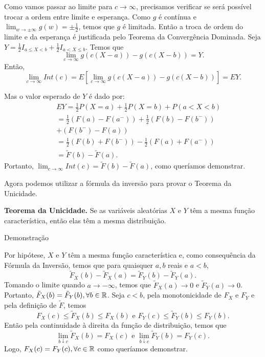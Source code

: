 \begin{frame}
\begin{block}{}

Como vamos passar ao limite para $c\rightarrow\infty$, precisamos verificar se será possível trocar a ordem entre limite e esperança. Como $g$ é contínua e $\lim_{w\rightarrow\pm\infty}g(w)=\pm\frac{1}{2}$, temos que $g$ é limitada. Então a troca de ordem do limite e da esperança é justificada pelo Teorema da Convergência Dominada. Seja $Y=\frac{1}{2}I_{a\leq X<b}+\frac{1}{2}I_{a< X\leq b}$. Temos que
$$\lim_{c\rightarrow\infty}g(c(X-a))-g(c(X-b))=Y.$$
Então,
$$\lim_{c\rightarrow\infty}Int(c)=E[\lim_{c\rightarrow\infty}g(c(X-a))-g(c(X-b))]=EY.$$

Mas o valor esperado de $Y$ é dado por:
\begin{eqnarray}
& & EY=\frac{1}{2}P(X=a)+\frac{1}{2}P(X=b)+P(a<X<b) \nonumber \\
& & =\frac{1}{2}(F(a)-F(a^-))+\frac{1}{2}(F(b)-F(b^-))\nonumber\\
& & +(F(b^-)-F(a)) \nonumber \\
& & =\frac{1}{2}(F(b)+F(b^-))-\frac{1}{2}(F(a)+F(a^-))\nonumber\\
& &=\tilde{F}(b)-\tilde{F}(a). \nonumber
\end{eqnarray}
Portanto, $\lim_{c\rightarrow\infty}Int(c) =\tilde{F}(b)-\tilde{F}(a)$, como queríamos demonstrar.

\end{block}
\end{frame}


\begin{frame}
Agora podemos utilizar a fórmula da inversão para provar o Teorema da Unicidade.

\begin{teo} {\bf Teorema da Unicidade.} Se as variáveis aleatórias $X$ e $Y$ têm a mesma função característica, então elas têm a mesma distribuição.
\end{teo}

\begin{block}{Demonstração}


Por hipótese, $X$ e $Y$ têm a mesma função característica e, como consequência da Fórmula da Inversão, temos que para quaisquer $a,b$ reais e $a<b$,
$$\tilde{F}_X(b)-\tilde{F}_X(a)=\tilde{F}_Y(b)-\tilde{F}_Y(a).$$
Tomando o limite quando $a\rightarrow-\infty$, temos que $\tilde{F}_X(a)\rightarrow 0$ e $\tilde{F}_Y(a)\rightarrow 0$. Portanto, $\tilde{F}_X(b)=\tilde{F}_Y(b),\forall b\in \mathbb{R}$. Seja $c<b$, pela monotonicidade de $F_X$ e $F_Y$ e pela definição de $\tilde{F}$, temos
$$F_X(c)\leq \tilde{F}_X(b)\leq F_X(b)\mbox{ e }F_Y(c)\leq \tilde{F}_Y(b)\leq F_Y(b).$$
Então pela continuidade à direita da função de distribuição, temos que
$$\lim_{b\downarrow c}\tilde{F}_X(b)=F_X(c)\mbox{ e }\lim_{b\downarrow c}\tilde{F}_Y(b)=F_Y(c).$$
Logo, $F_X(c)=F_Y(c),\forall c\in \mathbb{R}$ como queríamos demonstrar.

\end{block}
\end{frame}


